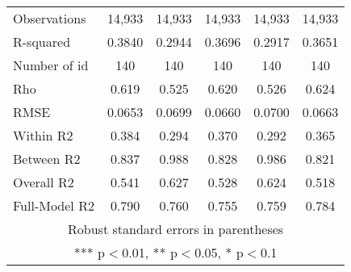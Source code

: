 \documentclass[]{article}
\begin{document}
\begin{tabular}{lccccc}
Observations & 14,933 & 14,933 & 14,933 & 14,933 & 14,933 \\
R-squared & 0.3840 & 0.2944 & 0.3696 & 0.2917 & 0.3651 \\
Number of id & 140 & 140 & 140 & 140 & 140 \\
Rho & 0.619 & 0.525 & 0.620 & 0.526 & 0.624 \\
RMSE & 0.0653 & 0.0699 & 0.0660 & 0.0700 & 0.0663 \\
Within R2 & 0.384 & 0.294 & 0.370 & 0.292 & 0.365 \\
Between R2 & 0.837 & 0.988 & 0.828 & 0.986 & 0.821 \\
Overall R2 & 0.541 & 0.627 & 0.528 & 0.624 & 0.518 \\
 Full-Model R2 & 0.790 & 0.760 & 0.755 & 0.759 & 0.784 \\ \hline
\multicolumn{6}{c}{ Robust standard errors in parentheses} \\
\multicolumn{6}{c}{ *** p$<$0.01, ** p$<$0.05, * p$<$0.1} \\
\end{tabular}
\end{document}
